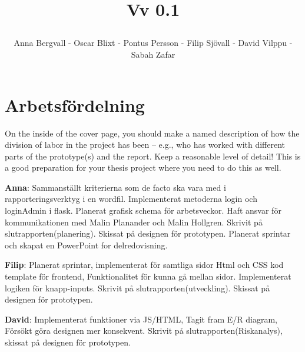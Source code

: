 \documentclass[12pt]{article}
\date {#1}
\title {
    \documentNumber {01}    

    \documentTitle {Helsingborg Event and Convention Bureau}
    
    \documentDate {2021-11-16}
    \documentVersion Vv 0.1
    
    \author{Anna Bergvall - Oscar Blixt - Pontus Persson - Filip Sjövall - David Vilppu - Sabah Zafar }
}
\begin{document}
\maketitle

\thispagestyle{empty}



\newpage

\tableofcontents



\newpage

   
   


\newpage

\section{Arbetsfördelning}
On the inside of the cover page, you should make a named description of how the division of labor in the project has been – e.g., who has worked with different parts of the prototype(s) and the report. Keep a reasonable level of detail! This is a good preparation for your thesis project where you need to do this as well.
    

\textbf{Anna}: Sammanställt kriterierna som de facto ska vara med i rapporteringsverktyg i en wordfil. Implementerat metoderna login och loginAdmin i flask. Planerat grafisk schema för arbetsveckor. Haft ansvar för kommunikationen med Malin Planander och Malin Hollgren. Skrivit på slutrapporten(planering). Skissat på designen för prototypen. Planerat sprintar och skapat en PowerPoint for delredovisning.

\textbf{Filip}: Planerat sprintar, implementerat för samtliga sidor Html och CSS kod template för frontend, Funktionalitet för kunna gå mellan sidor. Implementerat logiken för knapp-inputs. Skrivit på slutrapporten(utveckling). Skissat på designen för prototypen. 

\textbf{David}: Implementerat funktioner via JS/HTML, Tagit fram E/R diagram, Försökt göra designen mer konsekvent. Skrivit på slutrapporten(Riskanalys), skissat på designen för prototypen. 
\end{document}
